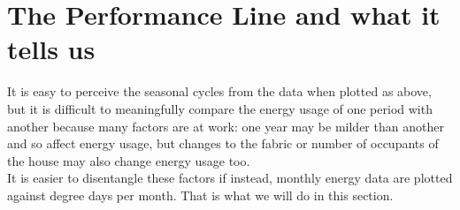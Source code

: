 \documentclass{article}
\begin{document}
\section{The Performance Line and what it tells us}

It is easy to perceive the seasonal cycles from the data when plotted as above, but it is difficult to meaningfully compare the energy usage of one period with another because many factors are at work: one year may be milder than another and so affect energy usage, but changes to the fabric or number of occupants of the house may also change energy usage too. \\It is easier to disentangle these factors if instead, monthly energy data are plotted against degree days per month. That is what we will do  in this section. 
\end{document}
